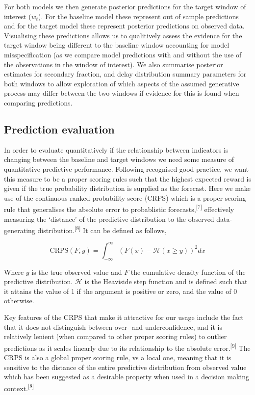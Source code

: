 \documentclass[
]{article}
\begin{document}
For both models we then generate posterior predictions for the target
window of interest (\(w_t\)). For the baseline model these represent out
of sample predictions and for the target model these represent posterior
predictions on observed data. Visualising these predictions allows us to
qualitively assess the evidence for the target window being different to
the baseline window accounting for model misspecification (as we compare
model predictions with and without the use of the observations in the
window of interest). We also summarise posterior estimates for secondary
fraction, and delay distribution summary parameters for both windows to
allow exploration of which aspects of the assumed generative process may
differ between the two windows if evidence for this is found when
comparing predictions.

\hypertarget{prediction-evaluation}{%
\subsection{Prediction evaluation}\label{prediction-evaluation}}

In order to evaluate quantitatively if the relationship between
indicators is changing between the baseline and target windows we need
some measure of quantitative predictive performance. Following
recognised good practice, we want this measure to be a proper scoring
rules such that the highest expected reward is given if the true
probability distribution is supplied as the forecast. Here we make use
of the continuous ranked probability score (CRPS) which is a proper
scoring rule that generalises the absolute error to probablistic
forecasts,\textsuperscript{{[}7{]}} effectively measuring the `distance'
of the predictive distribution to the observed data-generating
distribution.\textsuperscript{{[}8{]}} It can be defined as follows,

\[ \text{CRPS}(F, y) = \int_{-\infty}^\infty \left(F(x) -\mathcal{H}(x \geq y) \right)^2 dx \]

Where \(y\) is the true observed value and \(F\) the cumulative density
function of the predictive distribution. \(\mathcal{H}\) is the
Heaviside step function and is defined such that it attains the value of
1 if the argument is positive or zero, and the value of 0 otherwise.

Key features of the CRPS that make it attractive for our usage include
the fact that it does not distinguish between over- and underconfidence,
and it is relatively lenient (when compared to other proper scoring
rules) to outlier predictions as it scales linearly due to its
relationship to the absolute error.\textsuperscript{{[}9{]}} The CRPS is
also a global proper scoring rule, vs a local one, meaning that it is
sensitive to the distance of the entire predictive distribution from
observed value which has been suggested as a desirable property when
used in a decision making context.\textsuperscript{{[}8{]}}
\end{document}
